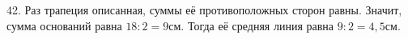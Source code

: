 42. Раз трапеция описанная, суммы её противоположных сторон равны. Значит, сумма оснований равна $18:2=9$см. Тогда её средняя линия равна $9:2=4,5$см.\\
